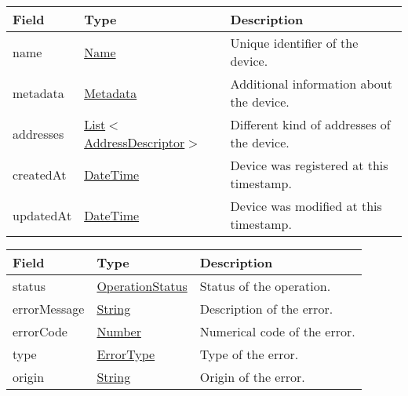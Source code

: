 \documentclass[a4paper]{arrowhead}
\newcommand{\pref}[1]{{\textcolor{ArrowheadGrey}{\hyperref[sec:model:primitives:#1]{#1}}}}
\begin{document}
\label{sec:model:DeviceDescriptor}
 
\begin{table}[ht!]
\begin{tabularx}{\textwidth}{| p{4.25cm} | p{4cm} | X |} \hline
\rowcolor{gray!33} Field & Type      & Description \\ \hline
name & \pref{Name} & Unique identifier of the device. \\ \hline
metadata & \hyperref[sec:model:Metadata]{Metadata} & Additional information about the device. \\ \hline
addresses &  \pref{List}$<$\hyperref[sec:model:AddressDescriptor]{AddressDescriptor}$>$ & Different kind of addresses of the device.  \\ \hline
createdAt & \pref{DateTime} & Device was registered at this timestamp. \\ \hline
updatedAt & \pref{DateTime} & Device was modified at this timestamp. \\ \hline
\end{tabularx}
\end{table}

\label{sec:model:ErrorResponse}

\begin{table}[ht!]
\begin{tabularx}{\textwidth}{| p{4.25cm} | p{3.5cm} | X |} \hline
\rowcolor{gray!33} Field & Type      & Description \\ \hline
status & \pref{OperationStatus} & Status of the operation. \\ \hline
errorMessage & \pref{String} & Description of the error. \\ \hline
errorCode &\pref{Number}  & Numerical code of the error. \\ \hline
type & \pref{ErrorType} & Type of the error. \\ \hline
origin & \pref{String} & Origin of the error. \\ \hline
\end{tabularx}
\end{table}

\clearpage

\label{sec:model:SystemLookupRequest}
\end{document}
